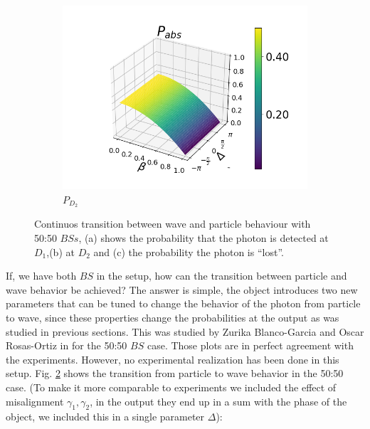 \documentclass[12pt]{book}
\begin{document}
\begin{figure}[H]
\begin{subfigure}[b]{0.40\linewidth}
\includegraphics[width=\linewidth]{images/pabs_2.png}
\caption{$P_{D_{2}}$ }
\label{fig:BS1}
\end{subfigure}
\caption{Continuos transition between wave and particle behaviour with 50:50 $BSs$, (a) shows the probability that the photon is detected at $D_{1}$,(b) at $D_{2}$ and (c) the probability the photon is ``lost''.}
\label{transzuri}
\end{figure}

If, we have both $BS$ in the setup, how can the transition between particle and wave behavior be achieved? The answer is simple, the object introduces two new parameters that can be tuned to change the behavior of the photon from particle to wave, since these properties change the probabilities at the output as was studied in previous sections. This was studied by Zurika Blanco-Garcia and Oscar Rosas-Ortiz in \cite{azuri} for the 50:50 $BS$ case. Those plots are in perfect agreement with the experiments. However, no experimental realization has been done in this setup. Fig. \ref{transzuri} shows the transition from particle to wave behavior in the 50:50 case. (To make it more comparable to experiments we included the effect of misalignment $\gamma_{1},\gamma_{2}$, in the output they end up in a sum with the phase of the object, we included this in a single parameter $\Delta$):
\end{document}
